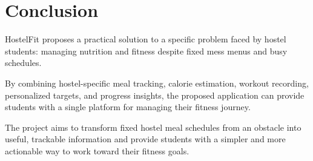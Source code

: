 \documentclass[11pt,a4paper]{article}
\begin{document}
\section{Conclusion}

HostelFit proposes a practical solution to a specific problem faced by hostel students: managing nutrition and fitness despite fixed mess menus and busy schedules.

By combining hostel-specific meal tracking, calorie estimation, workout recording, personalized targets, and progress insights, the proposed application can provide students with a single platform for managing their fitness journey.

The project aims to transform fixed hostel meal schedules from an obstacle into useful, trackable information and provide students with a simpler and more actionable way to work toward their fitness goals.
\end{document}
